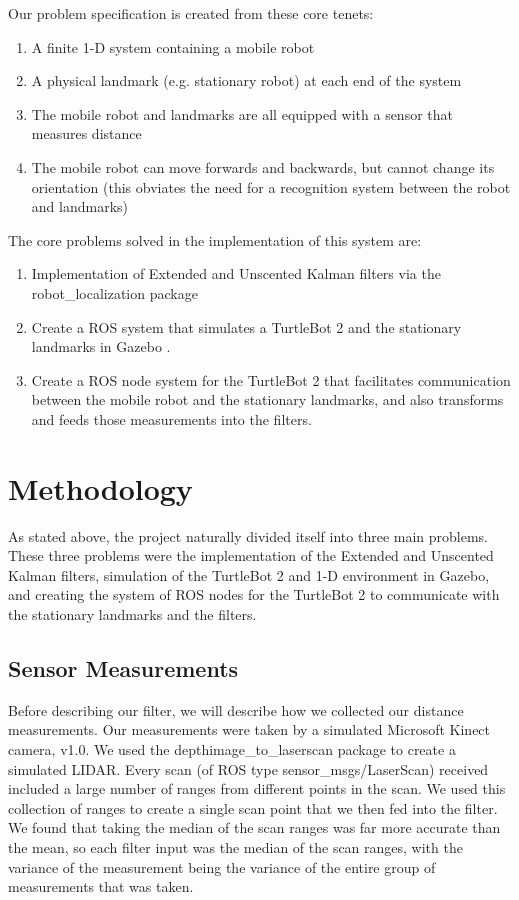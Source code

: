 \documentclass[conference]{IEEEtran}
\begin{document}
Our problem specification is created from these core tenets:
\begin{enumerate}
\item A finite 1-D system containing a mobile robot
\item A physical landmark (e.g. stationary robot) at each end of the system
\item The mobile robot and landmarks are all equipped with a sensor that measures distance
\item The mobile robot can move forwards and backwards, but cannot change its orientation (this obviates the need for a
recognition system between the robot and landmarks)
\end{enumerate}

The core problems solved in the implementation of this system are:
\begin{enumerate}
\item Implementation of Extended and Unscented Kalman filters via the robot\_localization package
\cite{robot_localization}
\item Create a ROS \cite{ros_original} system that simulates a TurtleBot 2 and the stationary landmarks in Gazebo
\cite{gazebo}.
\item Create a ROS node system for the TurtleBot 2 that facilitates communication between the mobile robot and the 
stationary landmarks, and also transforms and feeds those measurements into the filters.
\end{enumerate}


\section{Methodology}
As stated above, the project naturally divided itself into three main problems. These three problems were the
implementation of the Extended and Unscented Kalman filters, simulation of the TurtleBot 2 and 1-D environment in 
Gazebo, and creating the system of ROS nodes for the TurtleBot 2 to communicate with the stationary landmarks and the 
filters.

\subsection{Sensor Measurements} \label{Sensor Measurements}
Before describing our filter, we will describe how we collected our distance measurements. Our measurements were taken 
by a simulated Microsoft Kinect camera, v1.0. We used the depthimage\_to\_laserscan package \cite{depth_to_scan} to 
create a 
simulated LIDAR. Every scan (of ROS type sensor\_msgs/LaserScan) received included a large number of ranges from 
different points in the scan. We used this collection of ranges to create a single scan point that we then fed into the 
filter. We found that taking the median of the scan ranges was far more accurate than the mean, so each filter input 
was the median of the scan ranges, with the variance of the measurement being the variance of the entire group of 
measurements that was taken.
\end{document}
